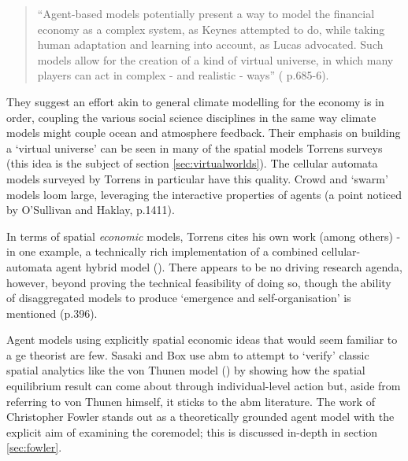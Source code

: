 \begin{quote}
``Agent-based models potentially present a way to model the financial economy as a complex system, as Keynes attempted to do, while taking human adaptation and learning into account, as Lucas advocated. Such models allow for the creation of a kind of virtual universe, in which many players can act in complex - and realistic - ways'' (\citealt{farmer_economy_2009} p.685-6).
\end{quote}

They suggest an effort akin to general climate modelling for the economy is in order, coupling the various social science disciplines in the same way climate models might couple ocean and atmosphere feedback. Their emphasis on  building a `virtual universe' can be seen in many of the spatial models Torrens surveys (this idea is the subject of section \ref{sec:virtualworlds}). The cellular automata models surveyed by Torrens in particular have this quality. Crowd and `swarm' models loom large, leveraging the interactive properties of agents (a point noticed by O'Sullivan and Haklay, \citeyear{osullivan_agent-based_2000} p.1411). 

In terms of spatial \emph{economic} models, Torrens cites his own work (among others)  - in one example, a technically rich implementation of a combined cellular-automata agent hybrid model (\citealt{torrens_geographic_2005}). There appears to be no driving research agenda, however, beyond proving the technical feasibility of doing so, though the ability of disaggregated models to produce `emergence and self-organisation' is mentioned (p.396).

Agent models using explicitly spatial economic ideas that would seem familiar to a \gls{ge} theorist are few. Sasaki and Box  use \gls{abm} to attempt to `verify' classic spatial analytics like the von Thunen model (\citealt{sasaki_agent-based_2003}) by showing how the spatial equilibrium result can come about through individual-level action but, aside from referring to von Thunen himself, it sticks to the \gls{abm} literature. The work of Christopher Fowler stands out as a theoretically grounded agent model with the explicit aim of examining the \gls{coremodel}; this is discussed in-depth in section \ref{sec:fowler}.
